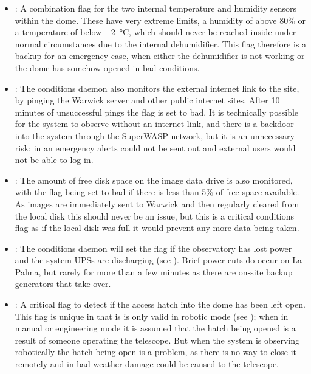 \begin{colsection}
\begin{colsection}
\begin{itemize}
    \item {}: A combination flag for the two internal temperature and humidity sensors within the dome. These have very extreme limits, a humidity of above 80\% or a temperature of below \SI{-2}{\celsius}, which should never be reached inside under normal circumstances due to the internal dehumidifier. This flag therefore is a backup for an emergency case, when either the dehumidifier is not working or the dome has somehow opened in bad conditions.

    \item {}: The conditions daemon also monitors the external internet link to the site, by pinging the Warwick server and other public internet sites. After 10 minutes of unsuccessful pings the flag is set to bad. It is technically possible for the system to observe without an internet link, and there is a backdoor into the system through the SuperWASP network, but it is an unnecessary risk: in an emergency alerts could not be sent out and external users would not be able to log in.

    \item {}: The amount of free disk space on the image data drive is also monitored, with the flag being set to bad if there is less than 5\% of free space available. As images are immediately sent to Warwick and then regularly cleared from the local disk this should never be an issue, but this is a critical conditions flag as if the local disk was full it would prevent any more data being taken.

    \item {}: The conditions daemon will set the  flag if the observatory has lost power and the system UPSs are discharging (see ). Brief power cuts do occur on La Palma, but rarely for more than a few minutes as there are on-site backup generators that take over.

    \item {}: A critical flag to detect if the access hatch into the dome has been left open. This flag is unique in that is is only valid in robotic mode (see ); when in manual or engineering mode it is assumed that the hatch being opened is a result of someone operating the telescope. But when the system is observing robotically the hatch being open is a problem, as there is no way to close it remotely and in bad weather damage could be caused to the telescope.
\end{itemize}

\end{colsection}


\end{colsection}

